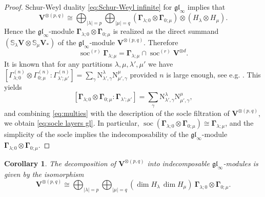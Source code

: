 \documentclass[12pt,reqno]{amsart}
\numberwithin{equation}{section}
\theoremstyle{plain}
\newtheorem{cor}[thm]{Corollary}
\theoremstyle{definition}
\def\gl{\mathfrak{gl}}
\def\LR{\mathrm N}
\def\soc{\operatorname{soc}}
\def\o{\otimes}
\def\glV_#1{\boldsymbol\Gamma_{#1}}
\def\SS{\mathbb S}
\def\VV{\mathbf V}
\def\({\left(}
\def\){\right)}
\begin{document}
\begin{proof}
Schur-Weyl duality \eqref{eq:Schur-Weyl infinite} for $\gl_\infty$
implies that
\begin{equation*}
    \VV^{\o(p,q)} \cong \bigoplus_{|\lambda|=p} \bigoplus_{|\mu| = q}
    (\glV_{\lambda;0} \o \glV_{0;\mu} )\o (H_\lambda \o H_\mu).
\end{equation*}
Hence the $\gl_\infty$-module $\glV_{\lambda; 0} \o \glV_{0;\mu}$ is
realized as the direct summand  $(\SS_\lambda \VV \o \SS_\mu \VV_*)$
of the $\gl_\infty$-module $\VV^{\o (p,q)}$. Therefore
\begin{equation*}
    \soc^{(r)} \glV_{\lambda;\mu} = \glV_{\lambda;\mu} \cap \soc^{(r)} \VV^{\o d}.
\end{equation*}
It is known that for any partitions $\lambda,\mu,\lambda',\mu'$ we
have $[\varGamma_{\lambda; 0}^{(n)} \o \varGamma_{0;\mu}^{(n)} :
\varGamma_{\lambda';\mu'}^{(n)}] = \sum_{\gamma}
\LR_{\lambda',\gamma}^\lambda \LR_{\mu',\gamma}^\mu$ provided $n$
is large enough, see e.g. \cite{HTW}. This yields
\begin{equation}\label{eq:multies}
    [\glV_{\lambda; 0} \o \glV_{0;\mu} : \glV_{\lambda';\mu'}] =
    \sum_{\gamma} \LR_{\lambda',\gamma}^\lambda \LR_{\mu',\gamma}^\mu,
\end{equation}
and combining \eqref{eq:multies} with the description of the socle filtration of
$\VV^{\o(p,q)}$, we obtain \eqref{eq:socle layers gl}. In
particular, $\soc (\glV_{\lambda; 0} \o \glV_{0;\mu}) \cong
\glV_{\lambda;\mu}$, and the simplicity of the socle implies the
indecomposability of the $\gl_\infty$-module $\glV_{\lambda; 0} \o
\glV_{0;\mu}$.





\end{proof}



\begin{cor}
The decomposition of $\VV^{\o (p,q)}$ into indecomposable
$\gl_\infty$-modules is given by the isomorphism
\begin{equation*}
    \VV^{\o (p,q)} \cong \bigoplus_{|\lambda| = p} \bigoplus_{|\mu| = q}
    \( \dim H_\lambda \, \dim H_\mu \) \ \glV_{\lambda;0} \o \glV_{0;\mu}.
\end{equation*}
\end{cor}
\end{document}
